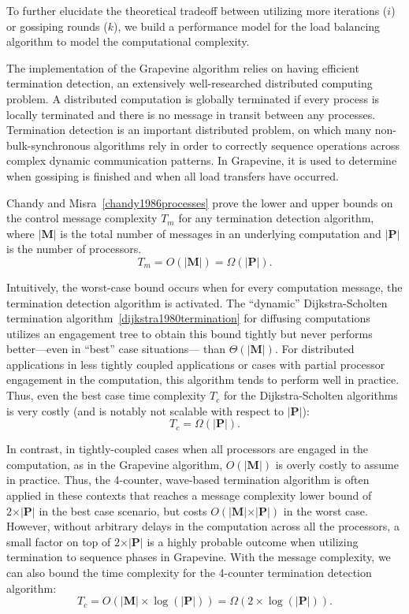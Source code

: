 To further elucidate the theoretical tradeoff between utilizing more iterations
($i$) or gossiping rounds ($k$), we build a performance model for the load
balancing algorithm to model the computational complexity.

The implementation of the \textsf{Grapevine} algorithm relies on having
efficient termination detection, an extensively well-researched distributed
computing problem. A distributed computation is globally terminated if every
process is locally terminated and there is no message in transit between any
processes. Termination detection is an important distributed problem,
on which many non-bulk-synchronous algorithms rely in order to
correctly sequence operations across complex dynamic communication
patterns.
In \textsf{Grapevine}, it is used to determine when gossiping is
finished and when all load transfers have occurred.

Chandy and Misra~\ref{chandy1986processes} prove the lower and upper bounds on
the control message complexity $T_m$ for any termination detection algorithm,
where $\vert\mathbf{M}\vert$ is the total number of messages in an underlying computation and $\vert\mathbf{P}\vert$
is the number of processors.
\[
T_m = O(\vert\mathbf{M}\vert) = \Omega(\vert\mathbf{P}\vert).
\]

Intuitively, the worst-case bound occurs when for every computation message, the
termination detection algorithm is activated. The ``dynamic'' Dijkstra-Scholten
termination algorithm~\ref{dijkstra1980termination} for diffusing computations
utilizes an engagement tree to obtain this bound tightly but never performs
better---even in ``best'' case situations--- than $\Theta(\vert\mathbf{M}\vert)$. For distributed
applications in less tightly coupled applications or cases with partial
processor engagement in the computation, this algorithm tends to perform well in
practice. Thus, even the best case time complexity $T_c$ for the
Dijkstra-Scholten algorithms is very costly (and is notably not scalable with
respect to $\vert\mathbf{P}\vert$):
\[
T_c = \Omega(\vert\mathbf{P}\vert).
\]

In contrast, in tightly-coupled cases when all processors are engaged in the
computation, as in the \textsf{Grapevine} algorithm, $O(\vert\mathbf{M}\vert)$ is overly costly to
assume in practice. Thus, the 4-counter, wave-based termination algorithm is
often applied in these contexts that reaches a message complexity lower bound of
$2\times \vert\mathbf{P}\vert$ in the best case scenario, but costs $O(\vert\mathbf{M}\vert\times \vert\mathbf{P}\vert)$ in the worst
case. However, without arbitrary delays in the computation across all the
processors, a small factor on top of $2\times \vert\mathbf{P}\vert$ is a highly probable outcome
when utilizing termination to sequence phases in \textsf{Grapevine}. With the
message complexity, we can also bound the time complexity for the 4-counter
termination detection algorithm:
\[
T_c = O(\vert\mathbf{M}\vert\times \log(\vert\mathbf{P}\vert)) = \Omega(2\times \log(\vert\mathbf{P}\vert)).
\]

